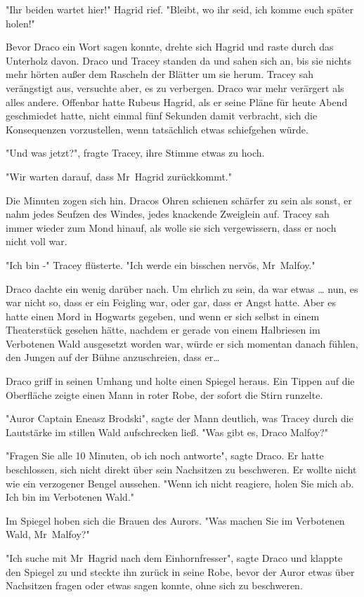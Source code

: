 {"Ihr beiden wartet hier!" Hagrid rief. "Bleibt, wo ihr seid, ich komme euch später holen!"

Bevor Draco ein Wort sagen konnte, drehte sich Hagrid und raste durch das Unterholz davon. Draco und Tracey standen da und sahen sich an, bis sie nichts mehr hörten außer dem Rascheln der Blätter um sie herum. Tracey sah verängstigt aus, versuchte aber, es zu verbergen. Draco war mehr verärgert als alles andere. Offenbar hatte Rubeus Hagrid, als er seine Pläne für heute Abend geschmiedet hatte, nicht einmal fünf Sekunden damit verbracht, sich die Konsequenzen vorzustellen, wenn tatsächlich etwas schiefgehen würde.

"Und was jetzt?", fragte Tracey, ihre Stimme etwas zu hoch.

"Wir warten darauf, dass Mr~Hagrid zurückkommt."

Die Minuten zogen sich hin. Dracos Ohren schienen schärfer zu sein als sonst, er nahm jedes Seufzen des Windes, jedes knackende Zweiglein auf. Tracey sah immer wieder zum Mond hinauf, als wolle sie sich vergewissern, dass er noch nicht voll war.

"Ich bin -" Tracey flüsterte. "Ich werde ein bisschen nervös, Mr~Malfoy."

Draco dachte ein wenig darüber nach. Um ehrlich zu sein, da war etwas … nun, es war nicht so, dass er ein Feigling war, oder gar, dass er Angst hatte. Aber es hatte einen Mord in Hogwarts gegeben, und wenn er sich selbst in einem Theaterstück gesehen hätte, nachdem er gerade von einem Halbriesen im Verbotenen Wald ausgesetzt worden war, würde er sich momentan danach fühlen, den Jungen auf der Bühne anzuschreien, dass er…

Draco griff in seinen Umhang und holte einen Spiegel heraus. Ein Tippen auf die Oberfläche zeigte einen Mann in roter Robe, der sofort die Stirn runzelte.

"Auror Captain Eneasz Brodski", sagte der Mann deutlich, was Tracey durch die Lautstärke im stillen Wald aufschrecken ließ. "Was gibt es, Draco Malfoy?"

"Fragen Sie alle 10 Minuten, ob ich noch antworte", sagte Draco. Er hatte beschlossen, sich nicht direkt über sein Nachsitzen zu beschweren. Er wollte nicht wie ein verzogener Bengel aussehen. "Wenn ich nicht reagiere, holen Sie mich ab. Ich bin im Verbotenen Wald."

Im Spiegel hoben sich die Brauen des Aurors. "Was machen Sie im Verbotenen Wald, Mr~Malfoy?"

"Ich suche mit Mr~Hagrid nach dem Einhornfresser", sagte Draco und klappte den Spiegel zu und steckte ihn zurück in seine Robe, bevor der Auror etwas über Nachsitzen fragen oder etwas sagen konnte, ohne sich zu beschweren.

}
